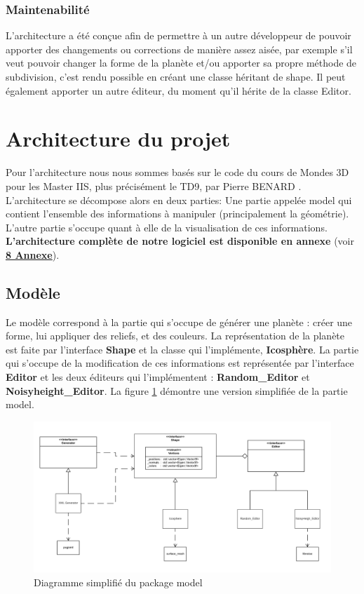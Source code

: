\documentclass[a4paper]{article}
\begin{document}
\subsubsection{Maintenabilité}
L'architecture a été conçue afin de permettre à un autre développeur de pouvoir apporter des changements ou corrections de manière assez aisée, par exemple s'il veut pouvoir changer la forme de la planète et/ou apporter sa propre méthode de subdivision, c'est rendu possible en créant une classe héritant de shape.
Il peut également apporter un autre éditeur, du moment qu'il hérite de la classe Editor.

\newpage 
\section{Architecture du projet}

Pour l'architecture nous nous sommes basés sur le code du cours de Mondes 3D pour les Master IIS, plus précisément le TD9, par Pierre BENARD \cite{TD_3D}. L'architecture se décompose alors en deux parties: Une partie appelée model qui contient l'ensemble des informations à manipuler (principalement la géométrie). L'autre partie s'occupe quant à elle de la visualisation de ces informations. \textbf{L'architecture complète de notre logiciel est disponible en annexe} (voir \hyperref[archiComplete]{\textbf{8 Annexe}}). 
\\


\subsection{Modèle}
Le modèle correspond à la partie qui s'occupe de générer une planète : créer une forme, lui appliquer des reliefs, et des couleurs. La représentation de la planète est faite par l'interface \textbf{Shape} et la classe qui l'implémente, \textbf{Icosphère}. La partie qui s'occupe de la modification de ces informations est représentée par l'interface \textbf{Editor} et les deux éditeurs qui l'implémentent : \textbf{Random\_Editor} et \textbf{Noisyheight\_Editor}. La figure \ref{archi_model} démontre une version simplifiée de la partie model.\\

 \begin{figure}[!ht]
        \begin{center} \includegraphics[width=\linewidth]{img/archi/model.png}\end{center}
        \caption{\label{archi_model}Diagramme simplifié du package model}
    \end{figure}
\end{document}
